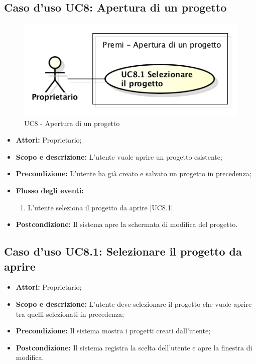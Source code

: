 \subsection{Caso d'uso UC8: Apertura di un progetto}
\begin{figure}[h] 
	\centering 
	\includegraphics[scale=0.45] {img/UC8.png} 
	\caption{UC8 - Apertura di un progetto} 
\end{figure}

\begin{itemize}
	\item \textbf{Attori:} Proprietario;
	\item \textbf{Scopo e descrizione:} L'utente vuole aprire un progetto esistente;
	\item \textbf{Precondizione:} L'utente ha già creato e salvato un progetto in precedenza;
	\item \textbf{Flusso degli eventi:}
	\begin{enumerate}
		\item L'utente seleziona il progetto da aprire [UC8.1].
	\end{enumerate}
	\item \textbf{Postcondizione:} Il sistema apre la schermata di modifica del progetto.
\end{itemize}


\subsection{Caso d'uso UC8.1: Selezionare il progetto da aprire}
\begin{itemize}
	\item \textbf{Attori:} Proprietario;
	\item \textbf{Scopo e descrizione:} L'utente deve selezionare il progetto che vuole aprire tra quelli selezionati in precedenza;
	\item \textbf{Precondizione:} Il sistema mostra i progetti creati dall'utente;
	\item \textbf{Postcondizione:} Il sistema registra la scelta dell'utente e apre la finestra di modifica.
\end{itemize}


